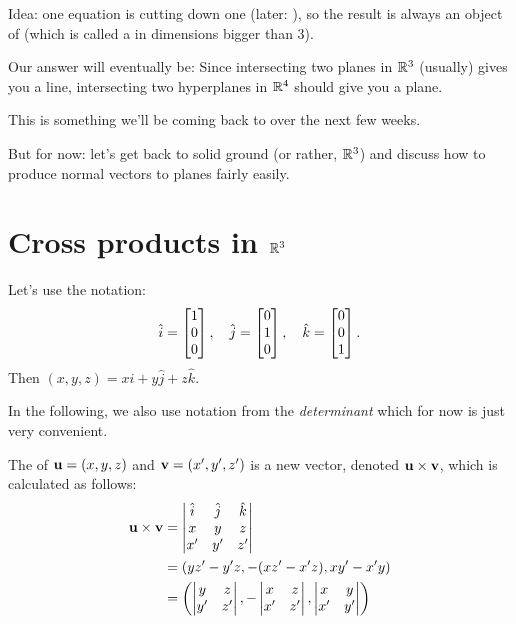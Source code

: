 Idea:  one equation is cutting down one 
(later: ), so the result is always an object
of  (which is called a  in dimensions bigger than 3).

Our answer will eventually be:  Since intersecting two planes in $\mathbb{R}^3$
(usually) gives you a line, intersecting two hyperplanes in $\mathbb{R}^4$ should
give you a plane.


This is something we'll be coming back to over the next
few weeks.


But for now: let's get back to solid ground (or rather, $\mathbb{R}^3$) and
discuss how to produce normal vectors to planes fairly easily.

\section{Cross products in \texorpdfstring{$\mathbb{R}^3$}{R3}}


Let's use the notation:
$$
\hat{i} = \left[ \begin{matrix} 1\\0\\0 \end{matrix} \right], \quad \hat{j} = \left[ \begin{matrix} 0\\1\\0 \end{matrix} \right], \quad \hat{k} = \left[ \begin{matrix} 0\\0\\1 \end{matrix} \right].
$$
Then $(x,y,z) = x\hat{i} + y\hat{j} + z\hat{k}$.

In the following, we also use notation from the \emph{determinant}
which for now is just very convenient.

The  of $\mathbf{u} = (x,y,z)$ and $\mathbf{v}=(x', y', z')$
is a new vector, denoted $\mathbf{u} \times \mathbf{v}$, which is calculated 
as follows:
\begin{align*}
\mathbf{u} \times \mathbf{v} &= \left| \begin{matrix}
\hat{i} & \hat{j} & \hat{k} \\
x & y & z\\
x' & y' & z' \end{matrix} \right|\\
&= \left( yz' - y'z, -(xz' - x'z), xy' - x'y \right) \\
&= \left( \left| \begin{matrix} y & z\\ y' & z' \end{matrix} \right|,
- \left| \begin{matrix} x & z\\ x' & z' \end{matrix} \right|,
\left| \begin{matrix} x & y\\ x' & y' \end{matrix} \right| \right)
\end{align*}

